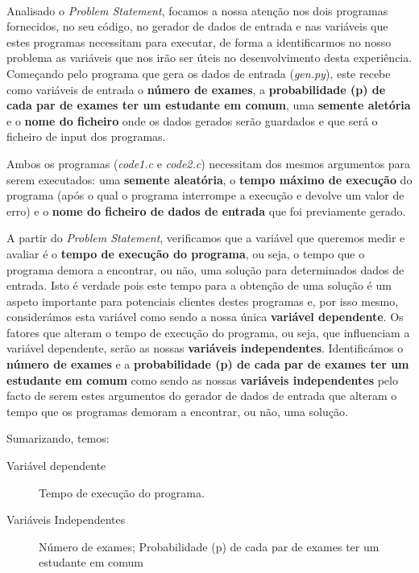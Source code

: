 \documentclass{article}
\begin{document}
\paragraph{}
Analisado o \textit{Problem Statement}, focamos a nossa atenção nos dois programas fornecidos, no seu código, no gerador de dados de entrada e nas variáveis que estes programas necessitam para executar, de forma a identificarmos no nosso problema as variáveis que nos irão ser úteis no desenvolvimento desta experiência.
Começando pelo programa que gera os dados de entrada (\textit{gen.py}), este recebe como variáveis de entrada o \textbf{número de exames}, a \textbf{probabilidade (p) de cada par de exames ter um estudante em comum}, uma \textbf{semente aletória} e o \textbf{nome do ficheiro} onde os dados gerados serão guardados e que será o ficheiro de input dos programas.\par
Ambos os programas (\textit{code1.c} e \textit{code2.c}) necessitam dos mesmos argumentos para serem executados: uma \textbf{semente aleatória}, o \textbf{tempo máximo de execução} do programa (após o qual o programa interrompe a execução e devolve um valor de erro) e o \textbf{nome do ficheiro de dados de entrada} que foi previamente gerado.\par
A partir do \textit{Problem Statement}, verificamos que a variável que queremos medir e avaliar é o \textbf{tempo de execução do programa}, ou seja, o tempo que o programa demora a encontrar, ou não, uma solução para determinados dados de entrada. Isto é verdade pois este tempo para a obtenção de uma solução é um aspeto importante para potenciais clientes destes programas e, por isso mesmo, considerámos esta variável como sendo a nossa única \textbf{variável dependente}. Os fatores que alteram o tempo de execução do programa, ou seja, que influenciam a variável dependente, serão as nossas \textbf{variáveis independentes}. Identificámos o \textbf{número de exames} e a \textbf{probabilidade (p) de cada par de exames ter um estudante em comum} como sendo as nossas \textbf{variáveis independentes} pelo facto de serem estes argumentos do gerador de dados de entrada que alteram o tempo que os programas demoram a encontrar, ou não, uma solução.\par

Sumarizando, temos:
\begin{description}
   \item[Variável dependente] Tempo de execução do programa.
   \item[Variáveis Independentes] Número de exames; Probabilidade (p) de cada par de exames ter um estudante em comum
\end{description}
\end{document}
